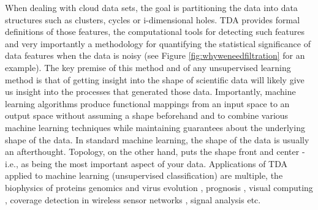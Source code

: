 \documentclass[onecollarge,runningheads]{svjour2}
\begin{document}
When dealing with cloud data sets, the goal is partitioning the data into data structures such as clusters, cycles or i-dimensional holes. TDA provides formal definitions of those features, the computational tools for detecting such features and very importantly a methodology for quantifying the statistical significance of data features when the data is noisy (see Figure \ref{fig:whyweneedfiltration} for an example). The key premise of this method and of any unsupervised learning method is that of getting insight into the shape of scientific data will likely give us insight into the processes that generated those data.
Importantly, machine learning algorithms produce functional mappings from an input space to an output space without assuming a shape beforehand and to combine various machine learning techniques while maintaining guarantees about the underlying shape of the data. In standard machine learning, the shape of the data is usually an afterthought. Topology, on the other hand, puts the shape front and center -i.e., as being the most important aspect of your data.
Applications of TDA applied to machine learning (unsupervised classification) are multiple, the biophysics of proteins \cite{gameiro2015topological} genomics and virus evolution \cite{chan2013topology}, prognosis \cite{schmidt2011disease}, visual computing \cite{bendich2010computing}, coverage detection in wireless sensor networks \cite{ghrist2005coverage}, signal analysis \cite{perea2015sliding} etc.


\end{document}
